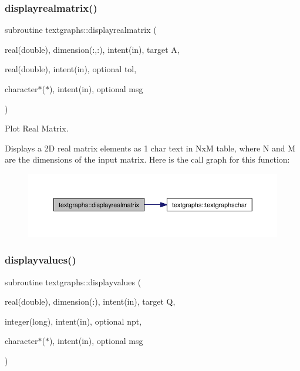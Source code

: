 \subsubsection{\texorpdfstring{displayrealmatrix()}{displayrealmatrix()}}
{\footnotesize\ttfamily subroutine textgraphs\+::displayrealmatrix (\begin{DoxyParamCaption}\item[{real(double), dimension(\+:,\+:), intent(in), target}]{A,  }\item[{real(double), intent(in), optional}]{tol,  }\item[{character$\ast$($\ast$), intent(in), optional}]{msg }\end{DoxyParamCaption})\hspace{0.3cm}{\ttfamily [private]}}



Plot Real Matrix. 

Displays a 2D real matrix elements as 1 char text in NxM table, where N and M are the dimensions of the input matrix. Here is the call graph for this function\+:\nopagebreak
\begin{figure}[H]
\begin{center}
\leavevmode
\includegraphics[width=350pt]{namespacetextgraphs_aec95adcc32b77f95f0a3625ca97cc374_cgraph}
\end{center}
\end{figure}
\mbox{\label{namespacetextgraphs_a7f733ce4082530e8bfeb1750d4870575}} 
\subsubsection{\texorpdfstring{displayvalues()}{displayvalues()}}
{\footnotesize\ttfamily subroutine textgraphs\+::displayvalues (\begin{DoxyParamCaption}\item[{real(double), dimension(\+:), intent(in), target}]{Q,  }\item[{integer(long), intent(in), optional}]{npt,  }\item[{character$\ast$($\ast$), intent(in), optional}]{msg }\end{DoxyParamCaption})\hspace{0.3cm}{\ttfamily [private]}}



